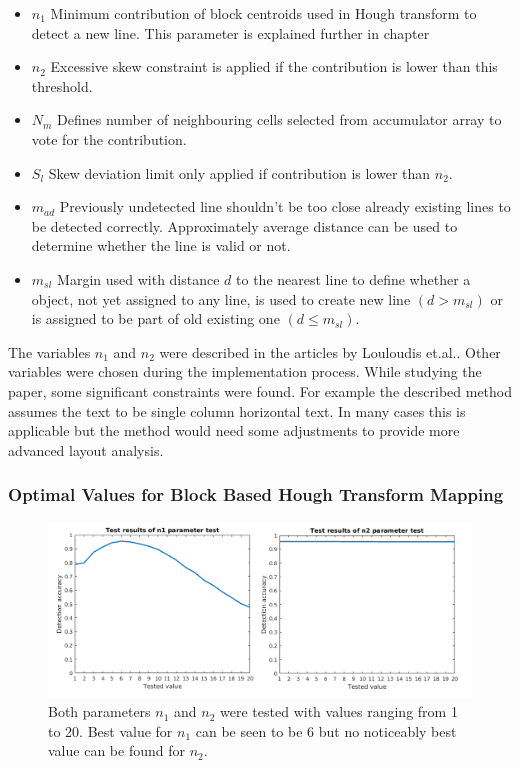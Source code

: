 \documentclass{article}
\begin{document}
      \begin{itemize}
        \item $n_1$ Minimum contribution of block centroids used in Hough transform to detect a new line. This parameter is explained further in chapter
        \item $n_2$ Excessive skew constraint is applied if the contribution is lower than this threshold.
        \item $N_m$  Defines number of neighbouring cells selected from accumulator array to vote for the contribution.
        \item $S_l$ Skew deviation limit only applied if contribution is lower than $n_2$.
        \item $m_{ad}$ Previously undetected line shouldn't be too close already existing lines to be detected correctly. Approximately average distance can be used to determine whether the line is valid or not.
        \item $m_{sl}$ Margin used with distance $d$ to the nearest line to define whether a object, not yet assigned to any line, is used to create new line $(d > m_{sl})$ or is assigned to be part of old existing one $(d \leq m_{sl})$.
      \end{itemize}

    The variables $n_1$ and $n_2$ were described in the articles by Louloudis et.al.. Other variables were chosen during the implementation process. While studying the paper, some significant constraints were found. For example the described method assumes the text to be single column horizontal text. In many cases this is applicable but the method would need some adjustments to provide more advanced layout analysis.

    \subsubsection{Optimal Values for Block Based Hough Transform Mapping}
    \begin{figure}[!ht]
      \centering
      \includegraphics[natwidth=1051,natheight=435,scale=0.45]{n1n2_acc.png}
      \caption{Both parameters $n_1$ and $n_2$ were tested with values ranging from 1 to 20. Best value for $n_1$ can be seen to be 6 but no noticeably best value can be found for $n_2$.
      \label{fig:n1n2}}
    \end{figure}
\end{document}
